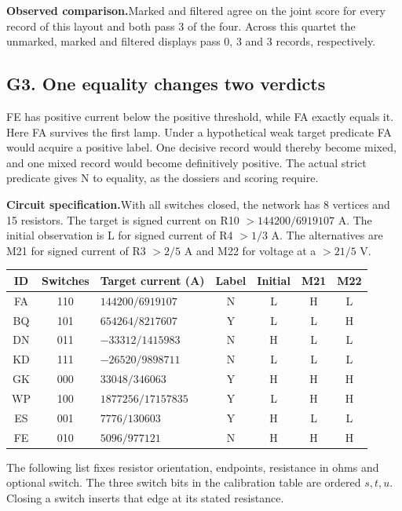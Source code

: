 \documentclass[12pt,letterpaper]{article}
\newcommand{\dossier}[2]{\clearpage\subsection*{#1}\phantomsection\label{#2}}
\newcommand{\reading}[2]{\par\smallskip\textsf{\color{accent}\bfseries #1}\enspace #2\par}
\begin{document}
\reading{Observed comparison.}{Marked and filtered agree on the joint score for every record of this layout and both pass 3 of the four. Across this quartet the unmarked, marked and filtered displays pass 0, 3 and 3 records, respectively.}

\dossier{G3. One equality changes two verdicts}{netG3}

FE has positive current below the positive threshold, while FA exactly equals it. Here FA survives the first lamp. Under a hypothetical weak target predicate FA would acquire a positive label. One decisive record would thereby become mixed, and one mixed record would become definitively positive. The actual strict predicate gives N to equality, as the dossiers and scoring require.

\reading{Circuit specification.}{With all switches closed, the network has 8 vertices and 15 resistors. The target is signed current on R10 $>144200/6919107$ A. The initial observation is L for signed current of R4 $>1/3$ A. The alternatives are M21 for signed current of R3 $>2/5$ A and M22 for voltage at a $>21/5$ V.}

\begin{center}{\small\setlength{\tabcolsep}{4pt}\begin{tabularx}{\linewidth}{@{}ccYcccc@{}}\toprule
ID & Switches & Target current (A) & Label & Initial & M21 & M22\\ \midrule
FA & 110 & $144200/6919107$ & N & L & H & L\\
BQ & 101 & $654264/8217607$ & Y & L & L & H\\
DN & 011 & $-33312/1415983$ & N & H & L & L\\
KD & 111 & $-26520/9898711$ & N & L & L & L\\
GK & 000 & $33048/346063$ & Y & H & H & H\\
WP & 100 & $1877256/17157835$ & Y & L & H & H\\
ES & 001 & $7776/130603$ & Y & H & L & L\\
FE & 010 & $5096/977121$ & N & H & H & H\\\bottomrule\end{tabularx}}\end{center}

The following list fixes resistor orientation, endpoints, resistance in ohms and optional switch. The three switch bits in the calibration table are ordered $s,t,u$. Closing a switch inserts that edge at its stated resistance.
\end{document}
